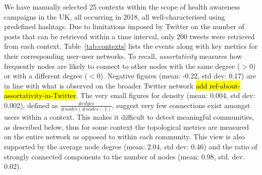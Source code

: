 \documentclass[runningheads]{llncs}
\begin{document}
We have manually selected 25 contexts within the scope of health awareness campaigns in the UK, all occurring in 2018, all well-characterised using predefined hashtags.
Due to limitations imposed by Twitter on the number of posts that can be retrieved within a time interval, only $200$ tweets were retrieved from each context.
 Table~\ref{tab:contexts} lists the events along with key metrics for their corresponding user-user networks. 
To recall, \textit{assortativity} measures how frequently nodes are likely to connect to other nodes with the same degree ($>0$) or with a different degree ($<0$). 
Negative figures (mean: -0.22, std dev: 0.17) are in line with what is observed on the broader Twitter network \hl{add ref-about-assortativity-in-Twitter}.
%
The very small figures for density (mean: 0.004, std dev: 0.002), defined as $\frac{\#edges }{\mathit{\mathit{\#nodes}} (\mathit{\#nodes} -1)}$, suggest very few connections exist amongst users within a context. 
This makes it difficult to detect meaningful communities, as described below, thus for some context the topological metrics are measured on the entire network as opposed to within each community.
This view is also supported by the average node degree (mean: 2.04, std dev: 0.46) and the ratio of strongly connected components to the number of nodes (mean: 0.98, std. dev. 0.02).
\end{document}
